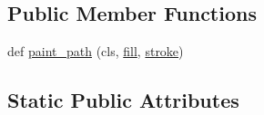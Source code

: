 \subsection*{Public Member Functions}
\begin{DoxyCompactItemize}
\item 
def \hyperlink{classmatplotlib_1_1backends_1_1backend__pdf_1_1Op_a99b9ab44864f18a6318e4036624caeef}{paint\+\_\+path} (cls, \hyperlink{classmatplotlib_1_1backends_1_1backend__pdf_1_1Op_ac0b9a9cfaaa282d298b1f376a0724a73}{fill}, \hyperlink{classmatplotlib_1_1backends_1_1backend__pdf_1_1Op_a534f852972ba97f05aa04004a1dc1030}{stroke})
\end{DoxyCompactItemize}
\subsection*{Static Public Attributes}
